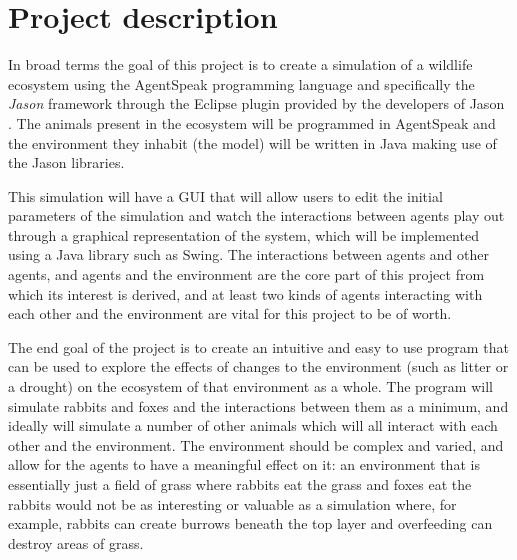 \documentclass[11pt,fleqn,twoside]{article}
\begin{document}
\wordcount{}

\mmp

\setcounter{tocdepth}{3} %


\section{Project description}

In broad terms the goal of this project is to create a simulation of a wildlife ecosystem using the AgentSpeak programming language and specifically the \textit{Jason} framework through the Eclipse plugin provided by the developers of Jason \citep{jason-2014}. The animals present in the ecosystem will be programmed in AgentSpeak and the environment they inhabit (the model) will be written in Java making use of the Jason libraries.

This simulation will have a GUI that will allow users to edit the initial parameters of the simulation and watch the interactions between agents play out through a graphical representation of the system, which will be implemented using a Java library such as Swing. The interactions between agents and other agents, and agents and the environment are the core part of this project from which its interest is derived, and at least two kinds of agents interacting with each other and the environment are vital for this project to be of worth.

The end goal of the project is to create an intuitive and easy to use program that can be used to explore the effects of changes to the environment (such as litter or a drought) on the ecosystem of that environment as a whole. The program will simulate rabbits and foxes and the interactions between them as a minimum, and ideally will simulate a number of other animals which will all interact with each other and the environment. The environment should be complex and varied, and allow for the agents to have a meaningful effect on it: an environment that is essentially just a field of grass where rabbits eat the grass and foxes eat the rabbits would not be as interesting or valuable as a simulation where, for example, rabbits can create burrows beneath the top layer and overfeeding can destroy areas of grass.
\end{document}
